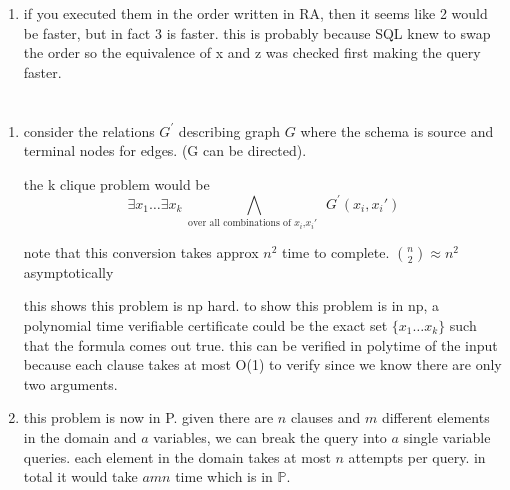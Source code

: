\documentclass{article}
\begin{document}
\begin{enumerate}
\begin{verbatim}
    Time: 221.799 ms
    \end{verbatim}


    

    \item if you executed them in the order written in RA, then it seems like 2 would be faster, but in fact 3 is faster. this is probably because SQL knew to swap the order so the equivalence of x and z was checked first making the query faster.

    



\end{enumerate}

\section{}
\begin{enumerate}
    \item consider the relations \(G^\prime\) describing graph \(G\) where the schema is source and terminal nodes for edges. (G can be directed).

    the k clique problem would be 
    \begin{equation}
        \exists x_1 \dots \exists x_k \bigwedge_\text{ over all combinations of $x_i$,$x_i'$ } G^\prime(x_i,x_i')
    \end{equation}

    note that this conversion takes approx \(n^2\) time to complete. \({n\choose 2}\approx n^2\) asymptotically

    this shows this problem is np hard. 
    to show this problem is in np, a polynomial time verifiable certificate could be the exact set \(\{x_1\dots x_k\} \) such that the formula comes out true. this can be verified in polytime of the input because each clause takes at most O(1) to verify since we know there are only two arguments. 
    \item this problem is now in P. given there are \(n\) clauses and \(m\) different elements in the domain and \(a\) variables, we can break the query into \(a\) single variable queries. each element in the domain takes at most \(n\) attempts per query. in total it would take \(a m n\) time which is in \(\mathbb P\).
\end{enumerate}
\end{document}
